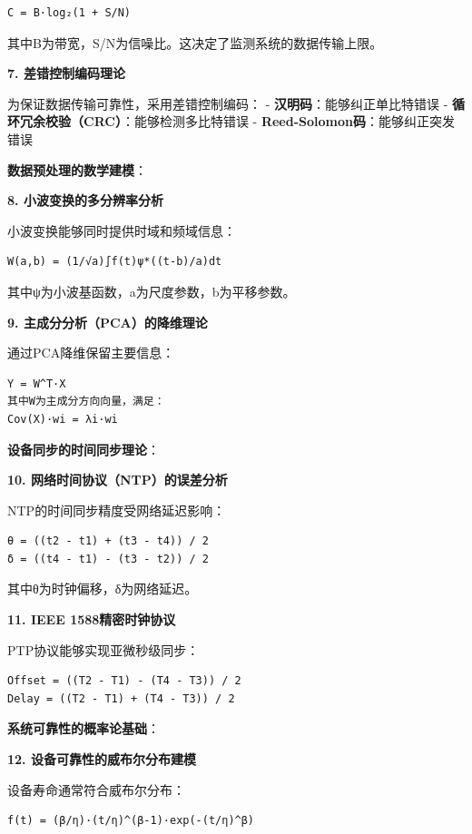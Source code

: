 \begin{lstlisting}
C = B·log₂(1 + S/N)
\end{lstlisting}

其中B为带宽，S/N为信噪比。这决定了监测系统的数据传输上限。

\textbf{7. 差错控制编码理论}

为保证数据传输可靠性，采用差错控制编码： - \textbf{汉明码}：能够纠正单比特错误 - \textbf{循环冗余校验（CRC）}：能够检测多比特错误 - \textbf{Reed-Solomon码}：能够纠正突发错误

\textbf{数据预处理的数学建模}：

\textbf{8. 小波变换的多分辨率分析}

小波变换能够同时提供时域和频域信息：

\begin{lstlisting}
W(a,b) = (1/√a)∫f(t)ψ*((t-b)/a)dt
\end{lstlisting}

其中ψ为小波基函数，a为尺度参数，b为平移参数。

\textbf{9. 主成分分析（PCA）的降维理论}

通过PCA降维保留主要信息：

\begin{lstlisting}
Y = W^T·X
其中W为主成分方向向量，满足：
Cov(X)·wi = λi·wi
\end{lstlisting}

\textbf{设备同步的时间同步理论}：

\textbf{10. 网络时间协议（NTP）的误差分析}

NTP的时间同步精度受网络延迟影响：

\begin{lstlisting}
θ = ((t2 - t1) + (t3 - t4)) / 2
δ = ((t4 - t1) - (t3 - t2)) / 2
\end{lstlisting}

其中θ为时钟偏移，δ为网络延迟。

\textbf{11. IEEE 1588精密时钟协议}

PTP协议能够实现亚微秒级同步：

\begin{lstlisting}
Offset = ((T2 - T1) - (T4 - T3)) / 2
Delay = ((T2 - T1) + (T4 - T3)) / 2
\end{lstlisting}

\textbf{系统可靠性的概率论基础}：

\textbf{12. 设备可靠性的威布尔分布建模}

设备寿命通常符合威布尔分布：

\begin{lstlisting}
f(t) = (β/η)·(t/η)^(β-1)·exp(-(t/η)^β)
\end{lstlisting}

